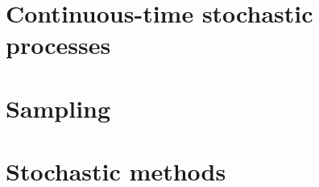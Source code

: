 \documentclass[oneside]{book}
\begin{document}
\part{Continuous-time stochastic processes}



\part{Sampling}




\part{Stochastic methods}




\end{document}
